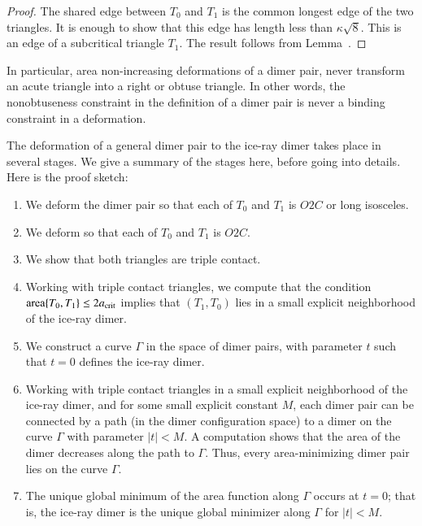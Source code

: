 \begin{proof}  
  The shared edge between $T_0$ and $T_1$ is the common longest edge
  of the two triangles.  It is enough to show that this edge has
  length less than $\kappa\sqrt8$.  This is an edge of a subcritical
  triangle $T_1$. The result follows from Lemma~.
\end{proof}

In particular, area non-increasing deformations of a dimer pair, never
transform an acute triangle into a right or obtuse triangle.  In other
words, the nonobtuseness constraint in the definition of a dimer pair
is never a binding constraint in a deformation.

The deformation of a general dimer pair to the ice-ray dimer takes
place in several stages.  We give a summary of the stages here, before
going into details.  Here is the proof sketch:

\begin{enumerate}
\item We deform the dimer pair so that each of $T_0$ and $T_1$ is $O2C$
or long isosceles.
\item We deform so that each of $T_0$ and $T_1$ is $O2C$.
\item We show that both triangles are triple contact.
\item Working with triple contact triangles, we compute that the
  condition ${\operatorname{area}}\{T_0,T_1\}\le 2a_\text{crit}$ implies that $(T_1,T_0)$
  lies in a small explicit neighborhood of the ice-ray dimer.
\item We construct a curve $\Gamma$ in the space of dimer pairs, with
  parameter $t$ such that $t=0$ defines the ice-ray dimer.
\item Working with triple contact triangles in a small explicit
  neighborhood of the ice-ray dimer, and for some small explicit
  constant $M$, each dimer pair can be connected by a path (in the
  dimer configuration space) to a dimer on the curve $\Gamma$ with
  parameter $|t|<M$.  A computation shows that the area of the dimer
  decreases along the path to $\Gamma$.  Thus, every area-minimizing
  dimer pair lies on the curve $\Gamma$.
\item The unique global minimum of the area function along $\Gamma$
  occurs at $t=0$; that is, the ice-ray dimer is the unique global
  minimizer along $\Gamma$ for $|t|<M$.
\end{enumerate}

